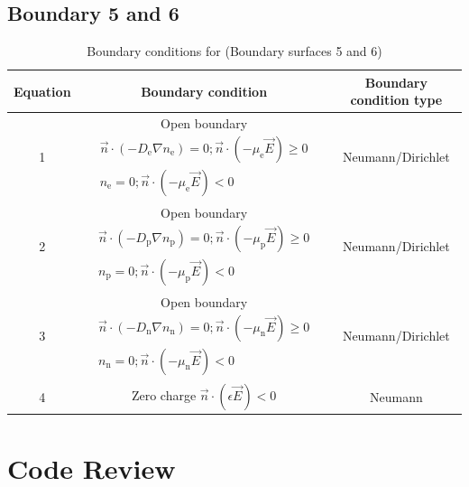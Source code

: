 \documentclass[12pt, a4paper]{report}
\begin{document}
\subsection{Boundary 5 and 6}

\begin{table}[!h]
    \centering\begin{tabular}{c|c|c}
        Equation & Boundary condition & Boundary condition type\\ \hline
        1 & Open boundary $\begin{array}{c}\vec{n} \cdot\left(-D_{\mathrm{e}} \nabla n_{\mathrm{e}}\right)=0 ; \vec{n} \cdot\left(-\mu_{\mathrm{e}} \vec{E}\right) \geqslant 0 \\ n_{\mathrm{e}}=0 ; \vec{n} \cdot\left(-\mu_{\mathrm{e}} \vec{E}\right)<0\end{array} $ & Neumann/Dirichlet \\ \hline
        2 & Open boundary $\begin{array}{c}\vec{n} \cdot\left(-D_{\mathrm{p}} \nabla n_{\mathrm{p}}\right)=0 ; \vec{n} \cdot\left(-\mu_{\mathrm{p}} \vec{E}\right) \geqslant 0 \\ n_{\mathrm{p}}=0 ; \vec{n} \cdot\left(-\mu_{\mathrm{p}} \vec{E}\right)<0\end{array} $   & Neumann/Dirichlet \\ \hline
        3 & Open boundary $\begin{array}{c}\vec{n} \cdot\left(-D_{\mathrm{n}} \nabla n_{\mathrm{n}}\right)=0 ; \vec{n} \cdot\left(-\mu_{\mathrm{n}} \vec{E}\right) \geqslant 0 \\ n_{\mathrm{n}}=0 ; \vec{n} \cdot\left(-\mu_{\mathrm{n}} \vec{E}\right)<0\end{array} $  & Neumann/Dirichlet\\ \hline
        4 & Zero charge $\vec{n} \cdot\left(\epsilon \vec{E}\right)<0$ & Neumann \\ \hline

    \end{tabular}
    \caption{Boundary conditions for  (Boundary surfaces 5 and 6)}
\end{table}

\section{\bf \large Code Review}
\end{document}
